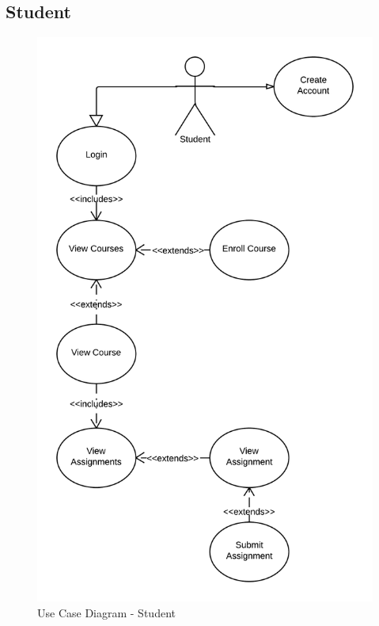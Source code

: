 \label{sec:useCase}
\subsection*{Student}
\begin{figure}[H]
	\centering
	\includegraphics[scale=0.2]{img/useCaseStudent}
	\caption{Use Case Diagram - Student}
\end{figure}

